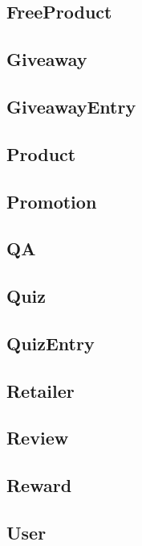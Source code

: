 \documentclass{article}
\begin{document}
\subsection{FreeProduct}

\subsection{Giveaway}

\subsection{GiveawayEntry}

\subsection{Product}

\subsection{Promotion}

\subsection{QA}

\subsection{Quiz}

\subsection{QuizEntry}

\subsection{Retailer}

\subsection{Review}

\subsection{Reward}

\subsection{User}

\end{document}
